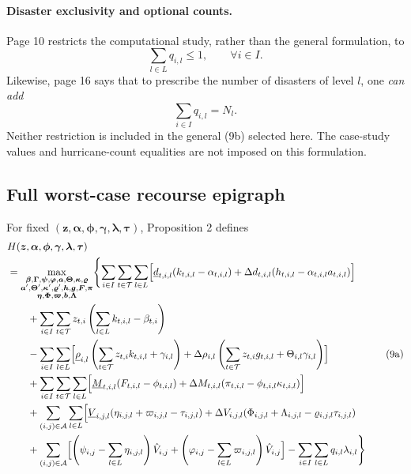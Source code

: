 \documentclass{article}
\begin{document}
\paragraph{Disaster exclusivity and optional counts.}
Page 10 restricts the computational study, rather than the general formulation, to
\[
\sum_{l\in L}q_{i,l}\leq1,\qquad\forall i\in I.
\]
Likewise, page 16 says that to prescribe the number of disasters of level $l$, one
\emph{can add}
\[
\sum_{i\in I}q_{i,l}=N_l.
\]
Neither restriction is included in the general (9b) selected here. The case-study
values and hurricane-count equalities are not imposed on this formulation.

\subsection*{Full worst-case recourse epigraph}
For fixed $(\boldsymbol z,\boldsymbol\alpha,\boldsymbol\phi,
\boldsymbol\gamma,\boldsymbol\lambda,\boldsymbol\tau)$, Proposition 2 defines
\begin{equation}
\begin{aligned}
&H(\boldsymbol z,\boldsymbol\alpha,\boldsymbol\phi,
\boldsymbol\gamma,\boldsymbol\lambda,\boldsymbol\tau)\\
&=\max_{\substack{
\boldsymbol\beta,\boldsymbol\Gamma,\boldsymbol\psi,\boldsymbol\varphi,
\boldsymbol a,\boldsymbol\Theta,\boldsymbol\kappa,\boldsymbol\varrho\\
\boldsymbol a',\boldsymbol\Theta',\boldsymbol\kappa',\boldsymbol\varrho',
\boldsymbol h,\boldsymbol g,\boldsymbol F,\boldsymbol\pi\\
\boldsymbol\eta,\boldsymbol\Phi,\boldsymbol\varpi,\boldsymbol b,\boldsymbol\Lambda}}
\Biggl\{\sum_{i\in I}\sum_{t\in\mathcal T}\sum_{l\in L}
\Bigl[\underline d_{t,i,l}(k_{t,i,l}-\alpha_{t,i,l})
+\Delta d_{t,i,l}(h_{t,i,l}-\alpha_{t,i,l}a_{t,i,l})\Bigr]\\
&\qquad+\sum_{i\in I}\sum_{t\in\mathcal T}z_{t,i}
\left(\sum_{l\in L}k_{t,i,l}-\beta_{t,i}\right)\\
&\qquad-\sum_{i\in I}\sum_{l\in L}
\Bigl[\underline\rho_{i,l}\left(\sum_{t\in\mathcal T}z_{t,i}k_{t,i,l}+\gamma_{i,l}\right)
+\Delta\rho_{i,l}\left(\sum_{t\in\mathcal T}z_{t,i}g_{t,i,l}+\Theta_{i,l}\gamma_{i,l}\right)\Bigr]\\
&\qquad+\sum_{i\in I}\sum_{t\in\mathcal T}\sum_{l\in L}
\Bigl[\underline M_{t,i,l}(F_{t,i,l}-\phi_{t,i,l})
+\Delta M_{t,i,l}(\pi_{t,i,l}-\phi_{t,i,l}\kappa_{t,i,l})\Bigr]\\
&\qquad+\sum_{(i,j)\in\mathcal A}\sum_{l\in L}
\Bigl[\underline V_{i,j,l}(\eta_{i,j,l}+\varpi_{i,j,l}-\tau_{i,j,l})
+\Delta V_{i,j,l}(\Phi_{i,j,l}+\Lambda_{i,j,l}-\varrho_{i,j,l}\tau_{i,j,l})\\
&\qquad+\sum_{(i,j)\in\mathcal A}
\Bigl[\left(\psi_{i,j}-\sum_{l\in L}\eta_{i,j,l}\right)\hat V_{i,j}
+\left(\varphi_{i,j}-\sum_{l\in L}\varpi_{i,j,l}\right)\hat V_{i,j}\Bigr]
-\sum_{i\in I}\sum_{l\in L}q_{i,l}\lambda_{i,l}\Biggr\}
\end{aligned}\tag{9a}
\end{equation}
\end{document}
